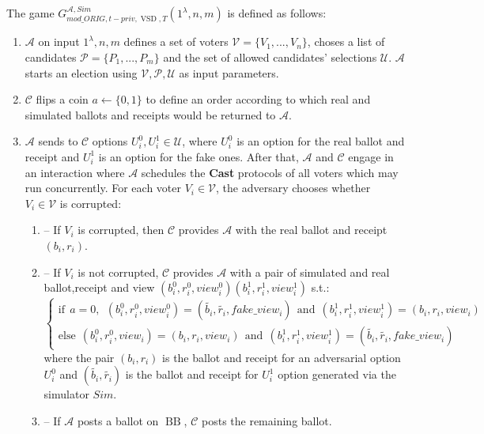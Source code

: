 \documentclass[12pt]{article}
\DeclareMathOperator{\vsd}{VSD}
\DeclareMathOperator{\bb}{BB}
\begin{document}
The game $G_{mod\_ORIG,t-priv, \vsd,T}^{\mathcal{A},Sim}(1^{\lambda},n,m)$ is defined as follows:
\begin{enumerate} 
\item $\mathcal{A}$ on input $1^{\lambda},n,m$ defines a set of voters  $\mathcal{V} = \{V_1,...,V_n\}$, choses a list of candidates  $\mathcal{P} = \{P_1,...,P_m\}$ and the set of allowed candidates' selections $\mathcal{U}$.  $\mathcal{A}$ starts an election using $\mathcal{V}, \mathcal{P}, \mathcal{U}$ as input parameters.
\item $\mathcal{C}$ flips a coin $a \leftarrow \{0,1\}$ to define an order according to which real and simulated ballots and receipts would be returned to $\mathcal{A}$.
\item   $\mathcal{A}$ sends to  $\mathcal{C}$ options $U_i^0, U_i^1 \in  \mathcal{U}$, where $U_i^0$ is an option for the real ballot and receipt and $U_i^1$ is an option for the fake ones.  After that, $\mathcal{A}$ and $\mathcal{C}$ engage in an interaction where $\mathcal{A}$ schedules the \textbf{Cast}   protocols of all voters which may run concurrently. For each voter $V_i \in \mathcal{V}$, the adversary chooses whether $V_i \in \mathcal{V}$ is corrupted: 
\begin{enumerate}
\item[] -- If $V_i$ is corrupted, then $\mathcal{C}$ provides $\mathcal{A}$ with the real ballot and receipt $(b_i,r_i)$.
\item[] --  If $V_i$ is not corrupted, $\mathcal{C}$  provides $\mathcal{A}$ with a pair of simulated and real ballot,receipt and view $(b_i^0, r_i^0,view_i^0) (b_i^1, r_i^1,view_i^1)$ s.t.:\\
$ \begin{cases}
 \text{if} ~~a =0,~~ (b_i^0,r_i^0,view_i^0) = (\tilde{b_i},\tilde{r_i},fake\_view_i) ~~ \text{and} ~~  (b_i^1,r_i^1,view_i^1) = (b_i,r_i,view_i)   \\ 
 \text{else}~~ (b_i^0,r_i^0,view_i) =(b_i,r_i,view_i)~~  \text{and} ~~  (b_i^1,r_i^1,view_i^1) =(\tilde{b_i},\tilde{r_i},fake\_view_i)
\end{cases}$\\ 
where the pair $(b_i, r_i)$ is the ballot and receipt for an adversarial option $U_i^0$ and $(\tilde{b_i},\tilde{r_i})$ is the ballot and receipt for  $U_i^1$ option generated via the simulator $Sim$.
\item[] --  If  $\mathcal{A}$ posts a ballot on $\bb$, $\mathcal{C}$ posts the remaining ballot. 
\end{enumerate}

\end{enumerate}
\end{document}
